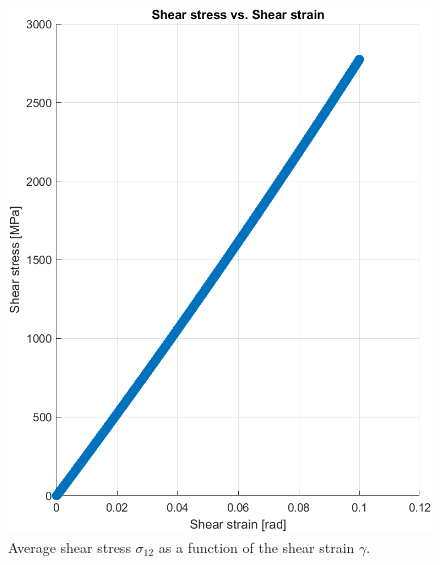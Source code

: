 \begin{figure}[H]
    \centering

    \begin{minipage}[b]{0.45\textwidth}
        \centering
        \includegraphics[width=\textwidth]{img/shear_stress_vs_strain.png}
        \caption{Average shear stress $\sigma_{12}$ as a function of the shear strain $\gamma$.}
        \label{fig:shear_stress_vs_strain}
    \end{minipage}
    \hfill
    \begin{minipage}[b]{0.45\textwidth}
        \centering

\end{minipage}
\end{figure}

